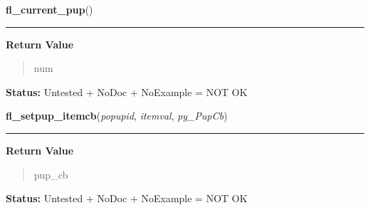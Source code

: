     \label{xformslib:library:fl_current_pup}

    \vspace{0.5ex}

\hspace{.8\funcindent}\begin{boxedminipage}{\funcwidth}

    \raggedright \textbf{fl\_current\_pup}()

    \vspace{-1.5ex}

    \rule{\textwidth}{0.5\fboxrule}
\setlength{\parskip}{2ex}
\setlength{\parskip}{1ex}
      \textbf{Return Value}
    \vspace{-1ex}

      \begin{quote}
      num

      \end{quote}

\textbf{Status:} Untested + NoDoc + NoExample = NOT OK



    \end{boxedminipage}

    \label{xformslib:library:fl_setpup_itemcb}

    \vspace{0.5ex}

\hspace{.8\funcindent}\begin{boxedminipage}{\funcwidth}

    \raggedright \textbf{fl\_setpup\_itemcb}(\textit{popupid}, \textit{itemval}, \textit{py\_PupCb})

    \vspace{-1.5ex}

    \rule{\textwidth}{0.5\fboxrule}
\setlength{\parskip}{2ex}
\setlength{\parskip}{1ex}
      \textbf{Return Value}
    \vspace{-1ex}

      \begin{quote}
      pup\_cb

      \end{quote}

\textbf{Status:} Untested + NoDoc + NoExample = NOT OK



    \end{boxedminipage}


